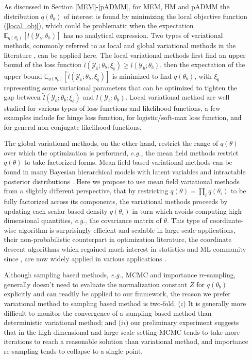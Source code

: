 \documentclass{article}
\newcommand{\eg}[0]{\emph{e.g., }}
\newcommand{\1}[0]{\ensuremath{\boldsymbol{1}}\xspace}
\begin{document}
As discussed in Section \ref{MEM}-\ref{pADMM}, for MEM, HM and pADMM the distribution $q(\theta_b)$ of interest is found by minimizing the local objective function (\ref{local_obj}), which could be problematic when the expectation $\mathbb{E}_{q(\theta_b)}[l(\mathcal{Y}_b; \theta_b)]$ has no analytical expression. Two types of variational methods, commonly referred to as local and global variational methods in the literature \cite{Bishop2006}, can be applied here. The local variational methods first find an upper bound of the loss function $\tilde l(\mathcal{Y}_b; \theta_b; \xi_b) \ge  l(\mathcal{Y}_b; \theta_b)$, then the expectation of the upper bound $\mathbb{E}_{q(\theta_b)}[\tilde l(\mathcal{Y}_b; \theta_b; \xi_b)]$ is minimized to find $q(\theta_b)$, with $\xi_b$ representing some variational parameters that can be optimized to tighten the gap between $\tilde l(\mathcal{Y}_b; \theta_b; \xi_b)$ and $l(\mathcal{Y}_b; \theta_b)$. Local variational method are well studied for various types of loss functions and likelihood functions, a few examples include \cite{Zhu2012} for hinge loss function, \cite{Jaakkola2000, Khan2010} for logistic/soft-max loss function, and \cite{Khan2013, Wang2013} for general non-conjugate likelihood functions. 

The global variational methods, on the other hand, restrict the range of $q(\theta)$ over which the optimization is performed, \eg the mean field methods restrict $q(\theta)$ to take factorized forms. Mean field based variational methods can be found in many Bayesian hierarchical models with latent variables and intractable posterior distributions \cite{Wainwright2008}. Here we propose to use mean field variational methods from a slightly different perspective, that by restricting $q(\theta) = \prod_i q(\theta_i)$ to be fully factorized across its components, the variational methods proceeds by updating each scalar based density $q(\theta_i)$ in turn which avoids computing high dimensional quantities, \eg the covariance matrix of $\theta$. This type of coordinate-wise algorithm is surprisingly efficient and scalable in large-scale applications, their non-probabilistic counterpart in optimization literature, the coordinate descent algorithms which regained much interest in statistics and ML community since \cite{Friedman2008, Banerjee2008}, are now widely applied in various applications \cite{Friedman2010, Bradley2011, Yuan2012, Yu2013}.

Although sampling based methods, \eg MCMC and importance re-sampling, generally doesn't need to evaluate the normalization constant $Z$ for $q(\theta_b)$ explicitly and can readily be applied to our framework, the reason we prefer variational method to sampling based method is two-fold, ($i$) It is generally more difficult to monitor the convergence of a sampling based method than deterministic variational method;  and ($ii$) our preliminary experiment suggests that in the high-dimensional and large-scale setting MCMC tends to take more iterations to reach a reasonable solution than variational method, and importance re-sampling tends to collapse to a single point.
\end{document}
